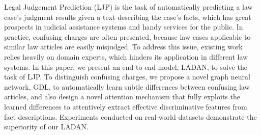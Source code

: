 Legal Judgement Prediction (LJP) is the task of automatically predicting a law case's judgment results given a text describing the case's facts, which has great prospects in judicial assistance systems and handy services for the public. In practice, confusing charges are often presented, because law cases applicable to similar law articles are easily misjudged. To address this issue, existing work relies heavily on domain experts, which hinders its application in different law systems. In this paper, we present an end-to-end model, LADAN, to solve the task of LJP. To distinguish confusing charges, we propose a novel graph neural network, GDL, to automatically learn subtle differences between confusing law articles, and also design a novel attention mechanism that fully exploits the learned differences to attentively extract effective discriminative features from fact descriptions. Experiments conducted on real-world datasets demonstrate the superiority of our LADAN.
